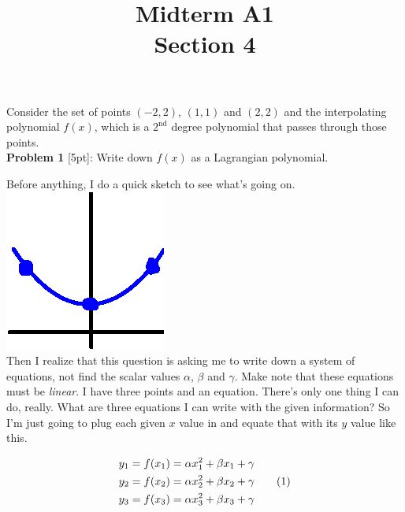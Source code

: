\documentclass{article}
\newcommand\numberthis{\addtocounter{equation}{1}\tag{\theequation}}
\def\a{\alpha}
\def\b{\beta}
\def\c{\gamma}
\begin{document}
 
 
 
\title{
    \textmd{\Huge{Midterm A1}}\\
    \textmd{\huge{Section 4}}
}


\maketitle

Consider the set of points $(-2, 2)$, $(1, 1)$ and $(2, 2)$ and the interpolating polynomial $f(x)$, which is a $2^\text{nd}$ degree polynomial that passes through those points. \\

\textbf{Problem 1} [5pt]: Write down $f(x)$ as a Lagrangian polynomial.

Before anything, I do a quick sketch to see what's going on. \hspace*{3cm}\includegraphics[scale=0.5]{thumbSketch}\\

Then I realize that this question is asking me to write down a system of equations, not find the scalar values $\a$, $\b$ and $\c$. Make note that these equations must be \textit{linear}. I have three points and an equation. There's only one thing I can do, really. What are three equations I can write with the given information? So I'm just going to plug each given $x$ value in and equate that with its $y$ value like this.

\begin{align*}
y_1 &= f(x_1) = \a x_1^2 + \b x_1 + \c \\
y_2 &= f(x_2) = \a x_2^2 + \b x_2 + \c \numberthis \\
y_3 &= f(x_3) = \a x_3^2 + \b x_3 + \c  \\
\end{align*}
\end{document}

